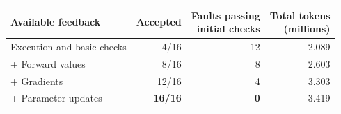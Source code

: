 \begin{tabular*}{\linewidth}{@{\extracolsep{\fill}}lrrr@{}}
\toprule
\textbf{Available feedback} & \textbf{Accepted} & \thead{Faults passing\\initial checks} & \thead{Total tokens\\(millions)} \\
\midrule
Execution and basic checks & 4/16 & 12 & 2.089 \\
\quad + Forward values & 8/16 & 8 & 2.603 \\
\quad + Gradients & 12/16 & 4 & 3.303 \\
\quad + Parameter updates & \textbf{16/16} & \textbf{0} & 3.419 \\
\bottomrule
\end{tabular*}
